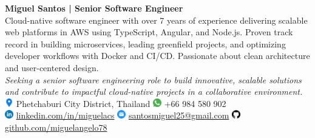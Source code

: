\documentclass[11pt,a4paper]{moderncv}
\title{} %
\begin{document}
\vspace*{-2em}
\noindent
\begin{minipage}[t]{0.13\textwidth}
\end{minipage}%
\hspace{2em}%
\begin{minipage}[c]{0.80\textwidth}
  \raggedright
  \textbf{\LARGE Miguel Santos | Senior Software Engineer}\\[0.3em]
  Cloud-native software engineer with over 7 years of experience delivering scalable web platforms in AWS using TypeScript, Angular, and Node.js. Proven track record in building microservices, leading greenfield projects, and optimizing developer workflows with Docker and CI/CD. Passionate about clean architecture and user-centered design.\\[0.3em]

  {\footnotesize
    \textit{Seeking a senior software engineering role to build innovative, scalable solutions and contribute to impactful cloud-native projects in a collaborative environment.}
  }\\[0.8em]
  {\footnotesize
    \includegraphics[height=1em]{images/icon-location.png}
    Phetchaburi City District, Thailand 
    \hspace{0.8em}
    {\includegraphics[height=1em]{images/icon-whatsapp.png}}
    +66 984 580 902 \\[0.3em]

    {\includegraphics[height=1em]{images/icon-linkedin.png}}
    \href{https://linkedin.com/in/miguelacs}{linkedin.com/in/miguelacs}
    \hspace{0.8em}
    {\includegraphics[height=1em]{images/icon-email.png}}
    \href{mailto:santosmiguel25@gmail.com}{santosmiguel25@gmail.com}
    \hspace{0.8em}
    {\includegraphics[height=1em]{images/icon-github.png}}
    \href{https://github.com/miguelangelo78}{github.com/miguelangelo78}
  }
\end{minipage}
\end{document}
